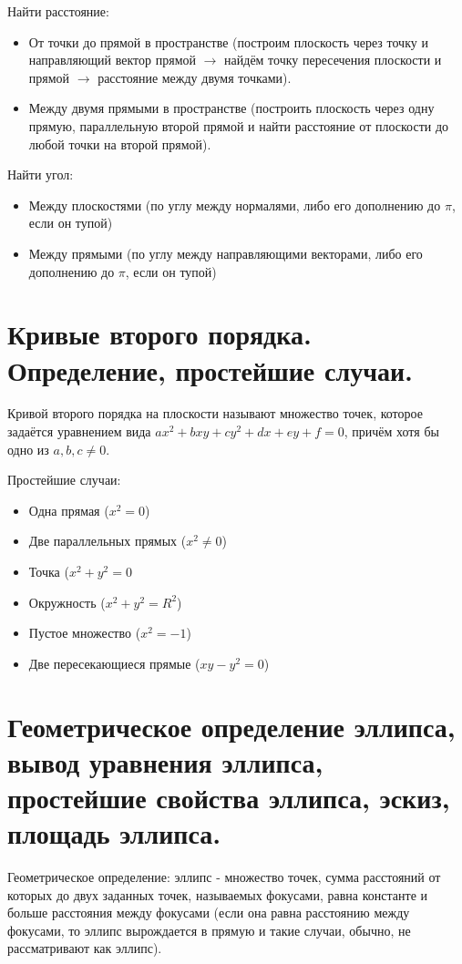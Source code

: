 \documentclass[12pt]{article}
\begin{document}
\begin{sloppypar}
    Найти расстояние:
    \begin{itemize}
        \item От точки до прямой в пространстве (построим плоскость через точку и направляющий вектор прямой $\rightarrow$ найдём точку пересечения плоскости и прямой $\rightarrow$ расстояние между двумя точками).
        \item Между двумя прямыми в пространстве (построить плоскость через одну прямую, параллельную второй прямой и найти расстояние от плоскости до любой точки на второй прямой).
    \end{itemize}

    Найти угол:
    \begin{itemize}
        \item Между плоскостями (по углу между нормалями, либо его дополнению до $\pi$, если он тупой)
        \item Между прямыми (по углу между направляющими векторами, либо его дополнению до $\pi$, если он тупой)
    \end{itemize}

    \section{Кривые второго порядка. Определение, простейшие случаи.}
    Кривой второго порядка на плоскости называют множество точек, которое задаётся уравнением вида $ax^2 + bxy + cy^2 + dx + ey + f = 0$, причём хотя бы одно из $a, b, c \neq 0$.

    Простейшие случаи:
    \begin{itemize}
        \item Одна прямая ($x^2 = 0$)
        \item Две параллельных прямых ($x^2 \neq 0$)
        \item Точка ($x^2 + y^2 = 0$
        \item Окружность ($x^2 + y^2 = R^2$)
        \item Пустое множество ($x^2 = -1$)
        \item Две пересекающиеся прямые ($xy - y^2 = 0$)
    \end{itemize}

    \section{Геометрическое определение эллипса, вывод уравнения эллипса, простейшие свойства эллипса, эскиз, площадь эллипса.}
    Геометрическое определение: эллипс - множество точек, сумма расстояний от которых до двух заданных точек, называемых фокусами, равна константе и больше расстояния между фокусами (если она равна расстоянию между фокусами, то эллипс вырождается в прямую и такие случаи, обычно, не рассматривают как эллипс).


\end{sloppypar}
\end{document}
